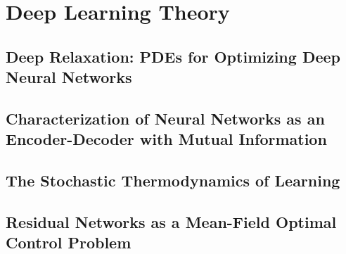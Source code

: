 \chapter{Deep Learning Theory}
\cite{blackbox} \cite{deeprelaxation} \cite{meanfield}


\section{Deep Relaxation: PDEs for Optimizing Deep Neural Networks}
\section{Characterization of Neural Networks as an Encoder-Decoder with Mutual Information}
\section{The Stochastic Thermodynamics of Learning}
\section{Residual Networks as a Mean-Field Optimal Control Problem}
